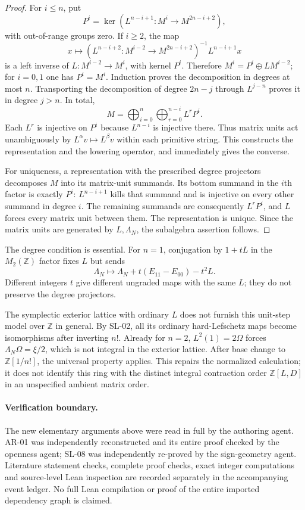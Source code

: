 \begin{proof}
For $i\le n$, put
\[
 P^i=\ker(L^{n-i+1}:M^i\to M^{2n-i+2}),
\]
with out-of-range groups zero.  If $i\ge2$, the map
\[
 x\longmapsto
 (L^{n-i+2}:M^{i-2}\to M^{2n-i+2})^{-1}L^{n-i+1}x
\]
is a left inverse of $L:M^{i-2}\to M^i$, with kernel $P^i$.
Therefore $M^i=P^i\oplus LM^{i-2}$; for $i=0,1$ one has $P^i=M^i$.
Induction proves the decomposition in degrees at most $n$.  Transporting
the decomposition of degree $2n-j$ through $L^{j-n}$ proves it in degree
$j>n$.  In total,
\[
 M=\bigoplus_{i=0}^n\bigoplus_{r=0}^{n-i}L^rP^i.
\]
Each $L^r$ is injective on $P^i$ because $L^{n-i}$ is injective there.
Thus matrix units act unambiguously by $L^\alpha v\mapsto L^\beta v$
within each primitive string.  This constructs the representation and
the lowering operator, and immediately gives the converse.

For uniqueness, a representation with the prescribed degree projectors
decomposes $M$ into its matrix-unit summands.  Its bottom summand in the
$i$th factor is exactly $P^i$: $L^{n-i+1}$ kills that summand and is
injective on every other summand in degree $i$.  The remaining summands
are consequently $L^rP^i$, and $L$ forces every matrix unit between them.
The representation is unique.  Since the matrix units are generated by
$L,\Lambda_N$, the subalgebra assertion follows.
\end{proof}

The degree condition is essential.  For $n=1$, conjugation by $1+tL$ in
the $M_2(\mathbb Z)$ factor fixes $L$ but sends
\[
 \Lambda_N\longmapsto
 \Lambda_N+t(E_{11}-E_{00})-t^2L.
\]
Different integers $t$ give different ungraded maps with the same $L$;
they do not preserve the degree projectors.

The symplectic exterior lattice with ordinary $L$ does not furnish this
unit-step model over $\mathbb Z$ in general.  By SL-02, all its ordinary
hard-Lefschetz maps become isomorphisms after inverting $n!$.  Already for
$n=2$, $L^2(1)=2\Omega$ forces $\Lambda_N\Omega=\xi/2$, which is not
integral in the exterior lattice.  After base change to
$\mathbb Z[1/n!]$, the universal property applies.  This repairs the
normalized calculation; it does not identify this ring with the distinct
integral contraction order $\mathbb Z[L,D]$ in an unspecified ambient
matrix order.

\paragraph{Verification boundary.}
The new elementary arguments above were read in full by the authoring
agent.  AR-01 was independently reconstructed and its entire proof checked
by the openness agent; SL-08 was independently re-proved by the sign-geometry
agent.  Literature statement checks, complete proof checks, exact integer
computations and source-level Lean inspection are recorded separately in
the accompanying event ledger.  No full Lean compilation or proof of the
entire imported dependency graph is claimed.
